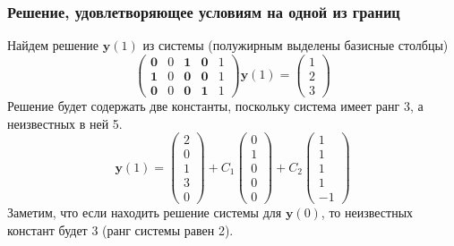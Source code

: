 \documentclass[professionalfonts,compress,unicode,aspectratio=169]{beamer}
\begin{document}
\begin{frame}\frametitle{Решение, удовлетворяющее условиям на одной из границ}
	Найдем решение $\mathbf{y}(1)$ из системы (полужирным выделены базисные
	столбцы)
	\[
	\begin{pmatrix}
	\mathbf{0} & 0 & \mathbf{1} & \mathbf{0} & 1\\
	\mathbf{1} & 0 & \mathbf{0} & \mathbf{0} & 1\\
	\mathbf{0} & 0 & \mathbf{0} & \mathbf{1} & 1
	\end{pmatrix}
	\mathbf{y}(1) = 
	\begin{pmatrix} 1 \\ 2 \\ 3\end{pmatrix}
	\]
	Решение будет содержать две константы, поскольку система имеет ранг 3, а
	неизвестных в ней 5.
	\[
	\mathbf{y}(1) = 
	\begin{pmatrix}
	2 \\ 0 \\ 1 \\ 3 \\ 0
	\end{pmatrix}
	+ C_1
	\begin{pmatrix}
	0 \\ 1 \\ 0 \\ 0 \\ 0
	\end{pmatrix}
	+ C_2
	\begin{pmatrix}
	1 \\ 1 \\ 1 \\ 1 \\ -1
	\end{pmatrix}
	\]
	Заметим, что если находить решение системы для $\mathbf{y}(0)$, то
	неизвестных констант будет 3 (ранг системы равен 2).
\end{frame}
\end{document}
